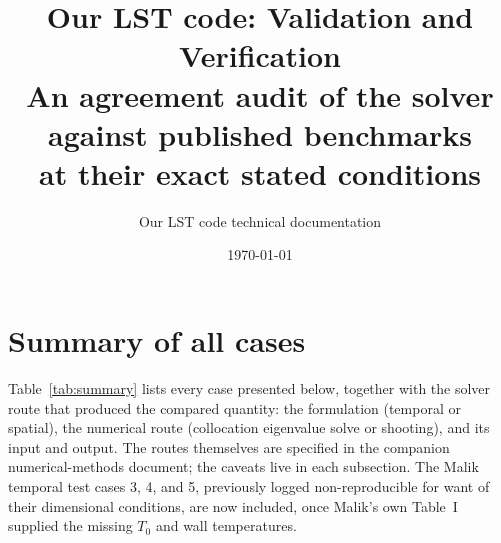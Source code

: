 \documentclass[11pt]{article}
\title{\textbf{Our LST code: Validation and Verification}\\[3pt]
\large An agreement audit of the solver against published benchmarks\\
at their exact stated conditions}
\author{Our LST code technical documentation}
\date{\today}
\begin{document}
\maketitle
\tableofcontents

\section{Summary of all cases}
\label{sec:summary-table}

Table~\ref{tab:summary} lists every case presented below, together with the solver route that
produced the compared quantity: the formulation (temporal or spatial), the numerical route
(collocation eigenvalue solve or shooting), and its input and output. The routes themselves are
specified in the companion numerical-methods document; the caveats live in each subsection. The
Malik temporal test cases 3, 4, and 5, previously logged non-reproducible for want of their
dimensional conditions, are now included, once Malik's own Table~I supplied the missing $T_0$ and
wall temperatures.
\end{document}
